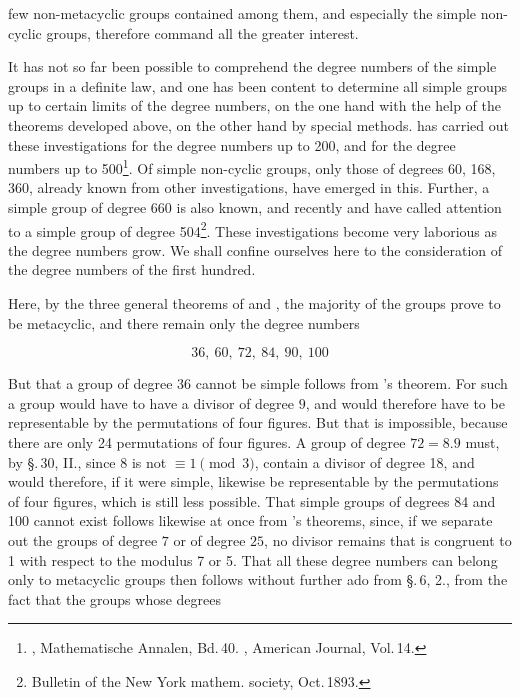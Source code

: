 few non-metacyclic groups contained among them, and especially the simple non-cyclic groups, therefore command all the greater interest.

It has not so far been possible to comprehend the degree numbers of the simple groups in a definite law, and one has been content to determine all simple groups up to certain limits of the degree numbers, on the one hand with the help of the theorems developed above, on the other hand by special methods.  has carried out these investigations for the degree numbers up to 200, and  for the degree numbers up to 500\footnote{, Mathematische Annalen, Bd.\,40. , American Journal, Vol.\,14.}. Of simple non-cyclic groups, only those of degrees 60, 168, 360, already known from other investigations, have emerged in this. Further, a simple group of degree 660 is also known, and recently  and  have called attention to a simple group of degree 504\footnote{Bulletin of the New York mathem. society, Oct.\,1893.}. These investigations become very laborious as the degree numbers grow. We shall confine ourselves here to the consideration of the degree numbers of the first hundred.

Here, by the three general theorems of  and , the majority of the groups prove to be metacyclic, and there remain only the degree numbers

\[ 36,\ 60,\ 72,\ 84,\ 90,\ 100 \]

But that a group of degree $36$ cannot be simple follows from 's theorem. For such a group would have to have a divisor of degree $9$, and would therefore have to be representable by the permutations of four figures. But that is impossible, because there are only 24 permutations of four figures. A group of degree $72 = 8 . 9$ must, by \S.\,30, II., since 8 is not $\equiv 1 \pmod{3}$, contain a divisor of degree 18, and would therefore, if it were simple, likewise be representable by the permutations of four figures, which is still less possible. That simple groups of degrees 84 and 100 cannot exist follows likewise at once from 's theorems, since, if we separate out the groups of degree $7$ or of degree $25$, no divisor remains that is congruent to 1 with respect to the modulus 7 or 5. That all these degree numbers can belong only to metacyclic groups then follows without further ado from \S.\,6, 2., from the fact that the groups whose degrees
